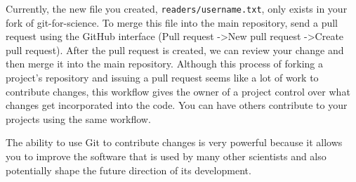 Currently, the new file you created, \verb|readers/username.txt|, only exists in your fork of git-for-science.
To merge this file into the main repository, send a pull request using the GitHub interface (Pull request -\textgreater New pull request -\textgreater Create pull request).
After the pull request is created, we can review your change and then merge it into the main repository.
Although this process of forking a project’s repository and issuing a pull request seems like a lot of work to contribute changes, this workflow gives the owner of a project control over what changes get incorporated into the code.
You can have others contribute to your projects using the same workflow. 

The ability to use Git to contribute changes is very powerful because it allows you to improve the software that is used by many other scientists and also potentially shape the future direction of its development.

  